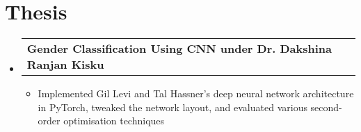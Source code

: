 \documentclass[letterpaper,10pt]{article}
\makeatletter
\newcommand{\resumeItemClean}[1]{
    \item\small{
        {#1 \vspace{-2pt}}
    }
}
\newcommand{\projectheading}[3]{
    \vspace{-1pt}\item
        \begin{tabular*}{0.97\textwidth}{l@{\extracolsep{\fill}}r}
            \textbf{#1} & \textbf{#2} #3\\
    \end{tabular*}\vspace{-5pt}
}
\newcommand{\resumeSubHeadingListStart}{\begin{itemize}[leftmargin=*]}
\newcommand{\resumeSubHeadingListEnd}{\end{itemize}}
\newcommand{\resumeItemListStart}{\begin{itemize}}
\newcommand{\resumeItemListEnd}{\end{itemize}\vspace{-5pt}}
\makeatother
\begin{document}
\section{Thesis}
\resumeSubHeadingListStart
\projectheading{Gender Classification Using CNN under Dr. Dakshina Ranjan Kisku}{}{}{}
            \resumeItemListStart
                \resumeItemClean
                    {Implemented Gil Levi and Tal Hassner's deep neural network architecture in PyTorch, tweaked the network layout, and evaluated various second-order optimisation techniques}
            \resumeItemListEnd
  \resumeSubHeadingListEnd
    
\end{document}
